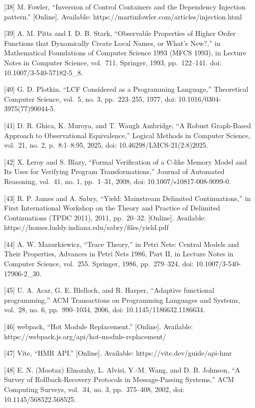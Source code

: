 \documentclass[
  10
]{article}
\begin{document}
{[}38{]} M. Fowler, ``Inversion of Control Containers and the Dependency Injection
pattern.'' {[}Online{]}. Available: https://martinfowler.com/articles/injection.html

{[}39{]} A. M. Pitts and I. D. B. Stark, ``Observable Properties of Higher Order
Functions that Dynamically Create Local Names, or What's New?,'' in Mathematical
Foundations of Computer Science 1993 (MFCS 1993), in Lecture Notes in Computer
Science, vol.~711. Springer, 1993, pp.~122--141. doi: 10.1007/3-540-57182-5\_8.

{[}40{]} G. D. Plotkin, ``LCF Considered as a Programming Language,'' Theoretical
Computer Science, vol.~5, no. 3, pp.~223--255, 1977, doi: 10.1016/0304-3975(77)90044-5.

{[}41{]} D. R. Ghica, K. Muroya, and T. Waugh Ambridge, ``A Robust Graph-Based
Approach to Observational Equivalence,'' Logical Methods in Computer Science,
vol.~21, no. 2, p.~8:1--8:95, 2025, doi: 10.46298/LMCS-21(2:8)2025.

{[}42{]} X. Leroy and S. Blazy, ``Formal Verification of a C-like Memory Model and
Its Uses for Verifying Program Transformations,'' Journal of Automated Reasoning,
vol.~41, no. 1, pp.~1--31, 2008, doi: 10.1007/s10817-008-9099-0.

{[}43{]} R. P. James and A. Sabry, ``Yield: Mainstream Delimited Continuations,'' in
First International Workshop on the Theory and Practice of Delimited Continuations
(TPDC 2011), 2011, pp.~20--32. {[}Online{]}. Available:
https://homes.luddy.indiana.edu/sabry/files/yield.pdf

{[}44{]} A. W. Mazurkiewicz, ``Trace Theory,'' in Petri Nets: Central Models and
Their Properties, Advances in Petri Nets 1986, Part II, in Lecture Notes in Computer
Science, vol.~255. Springer, 1986, pp.~279--324. doi: 10.1007/3-540-17906-2\_30.

{[}45{]} U. A. Acar, G. E. Blelloch, and R. Harper, ``Adaptive functional
programming,'' ACM Transactions on Programming Languages and Systems, vol.~28,
no. 6, pp.~990--1034, 2006, doi: 10.1145/1186632.1186634.

{[}46{]} webpack, ``Hot Module Replacement.'' {[}Online{]}. Available:
https://webpack.js.org/api/hot-module-replacement/

{[}47{]} Vite, ``HMR API.'' {[}Online{]}. Available: https://vite.dev/guide/api-hmr

{[}48{]} E. N. (Mootaz) Elnozahy, L. Alvisi, Y.-M. Wang, and D. B. Johnson, ``A
Survey of Rollback-Recovery Protocols in Message-Passing Systems,'' ACM Computing
Surveys, vol.~34, no. 3, pp.~375--408, 2002, doi: 10.1145/568522.568525.
\end{document}
